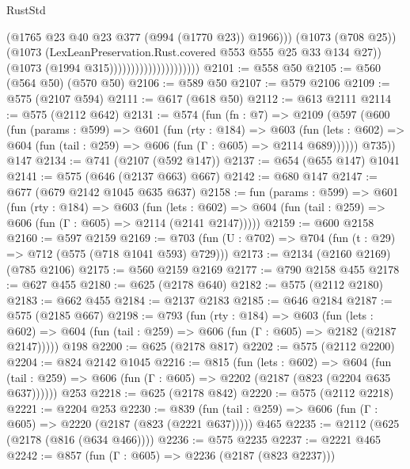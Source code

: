 \begin{lexlean}{RustStd}
\begin{coremodule}
                                              (@1765 @23 @40 @23 @377 (@994 (@1770 @23)) @1966)))
                                          (@1073 (@708 @25))
                                          (@1073
                                            (LexLeanPreservation.Rust.covered
                                              @553
                                              @555
                                              @25
                                              @33
                                              @134
                                              @27))
                                          (@1073 (@1994 @315)))))))))))))))))))))
@2101 := @558 @50
@2105 := @560 (@564 @50) (@570 @50)
@2106 := @589 @50
@2107 := @579 @2106
@2109 := @575 (@2107 @594)
@2111 := @617 (@618 @50)
@2112 := @613 @2111
@2114 := @575 (@2112 @642)
@2131 := @574
    (fun (fn : @7) =>
    @2109
      (@597
        (@600
          (fun (params : @599) =>
          @601
            (fun (rty : @184) =>
            @603
              (fun (lets : @602) =>
              @604 (fun (tail : @259) => @606 (fun (Γ : @605) => @2114 @689))))))
        @735))
    @147
@2134 := @741 (@2107 (@592 @147))
@2137 := @654 (@655 @147) @1041
@2141 := @575 (@646 (@2137 @663) @667)
@2142 := @680 @147
@2147 := @677 (@679 @2142 @1045 @635 @637)
@2158 := fun (params : @599) =>
  @601
    (fun (rty : @184) =>
    @603
      (fun (lets : @602) =>
      @604 (fun (tail : @259) => @606 (fun (Γ : @605) => @2114 (@2141 @2147)))))
@2159 := @600 @2158
@2160 := @597 @2159
@2169 := @703 (fun (U : @702) => @704 (fun (t : @29) => @712 (@575 (@718 @1041 @593) @729)))
@2173 := @2134 (@2160 @2169) (@785 @2106)
@2175 := @560 @2159 @2169
@2177 := @790 @2158 @455
@2178 := @627 @455
@2180 := @625 (@2178 @640)
@2182 := @575 (@2112 @2180)
@2183 := @662 @455
@2184 := @2137 @2183
@2185 := @646 @2184
@2187 := @575 (@2185 @667)
@2198 := @793
    (fun (rty : @184) =>
    @603
      (fun (lets : @602) =>
      @604 (fun (tail : @259) => @606 (fun (Γ : @605) => @2182 (@2187 @2147)))))
    @198
@2200 := @625 (@2178 @817)
@2202 := @575 (@2112 @2200)
@2204 := @824 @2142 @1045
@2216 := @815
    (fun (lets : @602) =>
    @604 (fun (tail : @259) => @606 (fun (Γ : @605) => @2202 (@2187 (@823 (@2204 @635 @637))))))
    @253
@2218 := @625 (@2178 @842)
@2220 := @575 (@2112 @2218)
@2221 := @2204 @253
@2230 := @839 (fun (tail : @259) => @606 (fun (Γ : @605) => @2220 (@2187 (@823 (@2221 @637))))) @465
@2235 := @2112 (@625 (@2178 (@816 (@634 @466))))
@2236 := @575 @2235
@2237 := @2221 @465
@2242 := @857 (fun (Γ : @605) => @2236 (@2187 (@823 @2237)))

\end{coremodule}
\end{lexlean}
